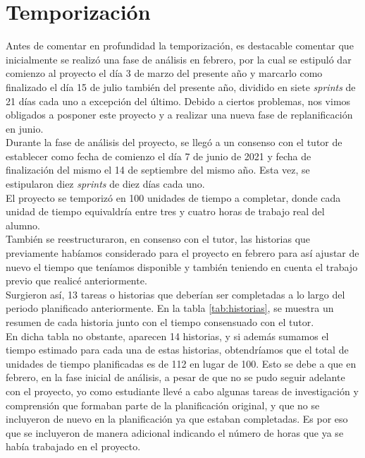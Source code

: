 \section{Temporización}

Antes de comentar en profundidad la temporización, es destacable comentar que inicialmente se realizó una fase de análisis en febrero, por la cual se estipuló dar comienzo al proyecto el día 3 de marzo del presente año y marcarlo como finalizado el día 15 de julio también del presente año, dividido en siete \textit{sprints} de 21 días cada uno a excepción del último. Debido a ciertos problemas, nos vimos obligados a posponer este proyecto y a realizar una nueva fase de replanificación en junio.\\

Durante la fase de análisis del proyecto, se llegó a un consenso con el tutor de establecer como fecha de comienzo el día 7 de junio de 2021 y fecha de finalización del mismo el 14 de septiembre del mismo año. Esta vez, se estipularon diez \textit{sprints} de diez días cada uno.\\

El proyecto se temporizó en 100 unidades de tiempo a completar, donde cada unidad de tiempo equivaldría entre tres y cuatro horas de trabajo real del alumno.\\

También se reestructuraron, en consenso con el tutor, las historias que previamente habíamos considerado para el proyecto en febrero para así ajustar de nuevo el tiempo que teníamos disponible y también teniendo en cuenta el trabajo previo que realicé anteriormente.\\

Surgieron así, 13 tareas o historias que deberían ser completadas a lo largo del periodo planificado anteriormente. En la tabla \ref{tab:historias}, se muestra un resumen de cada historia junto con el tiempo consensuado con el tutor.\\

En dicha tabla no obstante, aparecen 14 historias, y si además sumamos el tiempo estimado para cada una de estas historias, obtendríamos que el total de unidades de tiempo planificadas es de 112 en lugar de 100. Esto se debe a que en febrero, en la fase inicial de análisis, a pesar de que no se pudo seguir adelante con el proyecto, yo como estudiante llevé a cabo algunas tareas de investigación y comprensión que formaban parte de la planificación original, y que no se incluyeron de nuevo en la planificación ya que estaban completadas. Es por eso que se incluyeron de manera adicional indicando el número de horas que ya se había trabajado en el proyecto.

